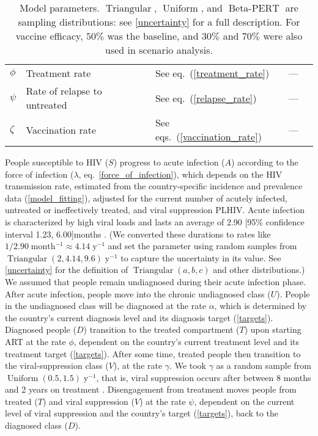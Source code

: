 \documentclass{article}
\DeclareMathOperator{\Uniform}{Uniform}
\DeclareMathOperator{\Triangular}{Triangular}
\DeclareMathOperator{\BetaPERT}{Beta-PERT}
\begin{document}
\begin{table}
\begin{center}
\begin{tabularx}{\textwidth}{lXlll}
      $\phi$ & Treatment rate & See eq.~(\ref{treatment_rate}) & --- \\
      $\psi$ & Rate of relapse to untreated & See eq.~(\ref{relapse_rate})
      & --- \\
      $\zeta$ & Vaccination rate & See eqs.~(\ref{vaccination_rate}) & --- \\
      \hline
    \end{tabularx}
    \caption{Model parameters. $\Triangular$, $\Uniform$, and
      $\BetaPERT$ are sampling distributions: see
      \autoref{uncertainty} for a full description.  For vaccine
      efficacy, $50\%$ was the baseline, and $30\%$ and $70\%$ were
      also used in scenario analysis.}
    \label{model_param}
  \end{center}
\end{table}

People susceptible to HIV ($S$) progress to acute infection ($A$)
according to the force of infection ($\lambda$,
eq.~\eqref{force_of_infection}), which depends on the HIV transmission
rate, estimated from the country-specific incidence and prevalence
data (\autoref{model_fitting}), adjusted for the current number of
acutely infected, untreated or ineffectively treated, and viral
suppression PLHIV.  Acute infection is characterized by high viral
loads and lasts an average of 2.90 [95\% confidence interval 1.23,
6.00]\;months \cite{Hollingsworth2008-iy}.  (We converted these
durations to rates like $1 / 2.90\;\text{month$^{-1}$} \approx
4.14\;\text{y$^{-1}$}$ and set the parameter using random samples from
$\Triangular(2, 4.14, 9.6)\;\text{y$^{-1}$}$ to capture the
uncertainty in its value.  See \autoref{uncertainty} for the
definition of $\Triangular(a, b, c)$ and other distributions.)  We
assumed that people remain undiagnosed during their acute infection
phase. After acute infection, people move into the chronic undiagnosed
class ($U$).  People in the undiagnosed class will be diagnosed at the
rate $\alpha$, which is determined by the country's current diagnosis
level and its diagnosis target (\autoref{targets}).  Diagnosed people
($D$) transition to the treated compartment ($T$) upon starting ART at
the rate $\phi$, dependent on the country's current treatment level
and its treatment target (\autoref{targets}).  After some time,
treated people then transition to the viral-suppression class ($V$),
at the rate $\gamma$.  We took $\gamma$ as a random sample from
$\Uniform(0.5, 1.5)\;\text{y$^{-1}$}$, that is, viral suppression
occurs after between 8 months and 2 years on treatment
\cite{Currie2009-yz}.  Disengagement from treatment moves people from
treated ($T$) and viral suppression ($V$) at the rate $\psi$,
dependent on the current level of viral suppression and the country's
target (\autoref{targets}), back to the diagnosed class ($D$).
\end{document}
